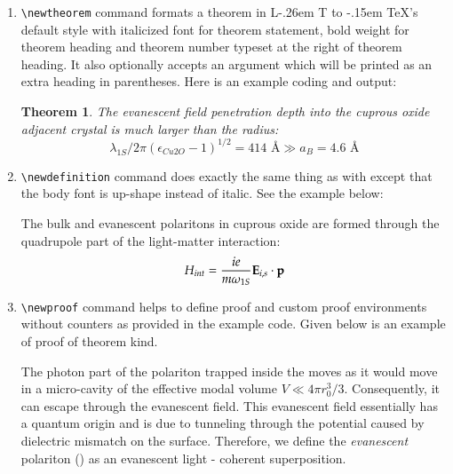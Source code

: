 \documentclass[a4paper,12pt]{article}
\makeatletter
\DeclareRobustCommand{\LaTeX}{L\kern-.26em%
        {\sbox\z@ T%
         \vbox to\ht\z@{\hbox{\check@mathfonts
           \fontsize\sf@size\z@
           \math@fontsfalse\selectfont
          A\,}%
         \vss}%
        }%
     \kern-.15em%
    \TeX}
\makeatother
\begin{document}
\begin{enumerate}
\item \verb+\newtheorem+ command formats a theorem in
\LaTeX's default style with italicized font for theorem
statement, bold weight for theorem heading and theorem
number typeset at the right of theorem heading. It also
optionally accepts an argument which will be printed as an
extra heading in parentheses. Here is an example coding and
output:

\begin{vquote}
\newtheorem{theorem}{Theorem}
\begin{theorem}\label{thm}
 The \WGM evanescent field penetration depth into the 
 cuprous oxide adjacent crystal is much larger than the 
 \QE radius: 
 \begin{equation*}
  \lambda_{1S}/2 \pi \left({\epsilon_{Cu2O}-1}
    \right)^{1/2} = 414 \mbox{ \AA} \gg a_B = 4.6 
    \mbox{ \AA}  
 \end{equation*}
\end{theorem}
\end{vquote}

\item \verb+\newdefinition+ command does exactly the same
thing as with except that the body font is up-shape instead
of italic. See the example below:

\begin{vquote}
\begin{definition}
 The bulk and evanescent polaritons in cuprous oxide
 are formed through the quadrupole part of the light-matter
 interaction:
 \begin{equation*}
  H_{int} = \frac{i e }{m \omega_{1S}} {\bf E}_{i,s} 
    \cdot {\bf p}
 \end{equation*}
\end{definition}
\end{vquote}

\item \verb+\newproof+ command helps to define proof and
custom proof environments without counters as provided in
the example code. Given below is an example of proof of
theorem kind.

\begin{vquote}
\begin{pot}
 The photon part of the polariton trapped inside the \PMS
 moves as it would move in a micro-cavity of the effective
 modal volume $V \ll 4 \pi r_{0}^{3} /3$. Consequently, it
 can escape through the evanescent field. This evanescent
 field essentially has a quantum origin and is due to
 tunneling through the potential caused by dielectric
 mismatch on the \PMS surface. Therefore, we define the
 \emph{evanescent} polariton (\EP) as an evanescent light -
 \QE coherent superposition.
\end{pot}
\end{vquote}

\end{enumerate}
\end{document}
